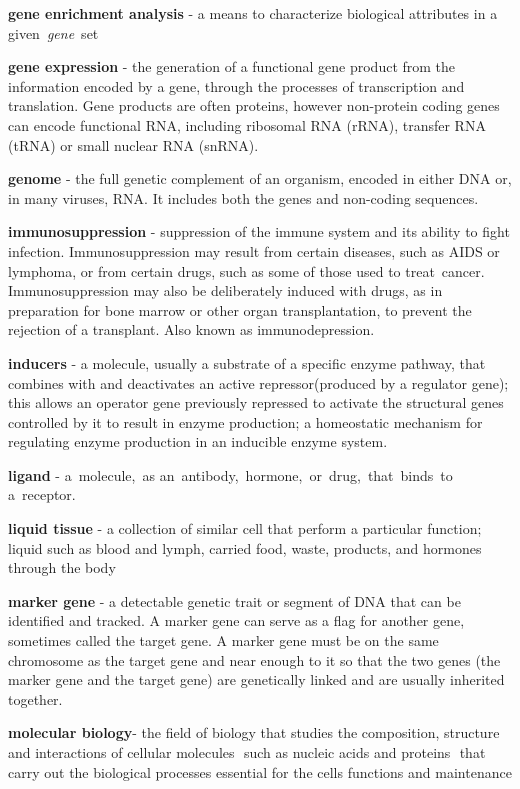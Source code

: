 \documentclass[12pt,]{book}
\theoremstyle{definition}
\theoremstyle{definition}
\theoremstyle{definition}
\theoremstyle{remark}
\begin{document}
\textbf{gene enrichment analysis} - a means to characterize biological
attributes in a given~\emph{gene}~set \citep{analysis}

\textbf{gene expression} - the generation of a functional gene product
from the information encoded by a gene, through the processes of
transcription and translation. Gene products are often proteins, however
non-protein coding genes can encode functional RNA, including ribosomal
RNA (rRNA), transfer RNA (tRNA) or small nuclear RNA (snRNA).
\citep{geneexprsNature}

\textbf{genome} - the full genetic complement of an organism, encoded in
either DNA or, in many viruses, RNA. It includes both the genes and
non-coding sequences. \citep{genomeNature}

\textbf{immunosuppression} - suppression of the immune system and its
ability to fight infection. Immunosuppression may result from certain
diseases, such as AIDS or lymphoma, or from certain drugs, such as some
of those used to treat~cancer. Immunosuppression may also be
deliberately induced with drugs, as in preparation for bone marrow or
other organ transplantation, to prevent the rejection of a transplant.
Also known as immunodepression. \citep{immunosupp}

\textbf{inducers} - a molecule, usually a substrate of a specific enzyme
pathway, that combines with and deactivates an active repressor(produced
by a regulator gene); this allows an operator gene previously repressed
to activate the structural genes controlled by it to result in enzyme
production; a homeostatic mechanism for regulating enzyme production in
an inducible enzyme system. \citep{inducer}

\textbf{ligand} - a~molecule,~as
an~antibody,~hormone,~or~drug,~that~binds~to a~receptor. \citep{ligand}

\textbf{liquid tissue} - a collection of similar cell that perform a
particular function; liquid such as blood and lymph, carried food,
waste, products, and hormones through the body \citep{tissue}

\textbf{marker gene} - a detectable genetic trait or segment of DNA that
can be identified and tracked. A marker gene can serve as a flag for
another gene, sometimes called the target gene. A marker gene must be on
the same chromosome as the target gene and near enough to it so that the
two genes (the marker gene and the target gene) are genetically linked
and are usually inherited together. \citep{marker}

\textbf{molecular biology}- the field of biology that studies the
composition, structure and interactions of cellular molecules  such as
nucleic acids and proteins  that carry out the biological processes
essential for the cells functions and maintenance \citep{biomolNature}
\end{document}
